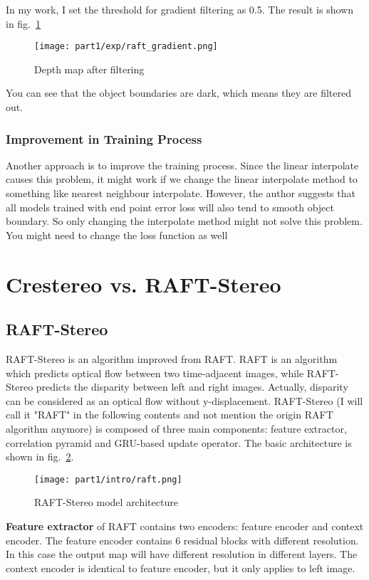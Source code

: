 \documentclass[12pt]{article}
\begin{document}
In my work, I set the threshold for gradient filtering as 0.5. The result is shown in fig.~\ref{gradient}
\begin{figure}[H]
    \centering
    \texttt{[image: part1/exp/raft\_gradient.png]}
    \caption{Depth map after filtering}
    \label{gradient}
\end{figure}
You can see that the object boundaries are dark, which means they are filtered out.
\subsubsection{Improvement in Training Process}
Another approach is to improve the training process. Since the linear interpolate causes this problem, it might work if we change the linear interpolate method to something like nearest neighbour interpolate. However, the author suggests that all models trained with end point error loss will also tend to smooth object boundary. So only changing the interpolate method might not solve this problem. You might need to change the loss function as well
\section{Crestereo vs. RAFT-Stereo}
\subsection{RAFT-Stereo\cite{raft-stereo}}
RAFT-Stereo is an algorithm improved from RAFT\cite{raft}. RAFT is an algorithm which predicts optical flow between two time-adjacent images, while RAFT-Stereo predicts the disparity between left and right images. Actually, disparity can be considered as an optical flow without y-displacement. RAFT-Stereo (I will call it "RAFT" in the following contents and not mention the origin RAFT algorithm anymore) is composed of three main components: feature extractor, correlation pyramid and GRU-based update operator. The basic architecture is shown in fig.~\ref{raft}.
\begin{figure}[H]
    \centering
    \texttt{[image: part1/intro/raft.png]}
    \caption{RAFT-Stereo model architecture}
    \label{raft}
\end{figure}
\textbf{Feature extractor} of RAFT contains two encoders: feature encoder and context encoder. The feature encoder contains 6 residual blocks with different resolution. In this case the output map will have different resolution in different layers. The context encoder is identical to feature encoder, but it only applies to left image.
\end{document}
